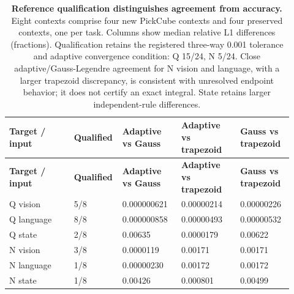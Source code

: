 \setlength{\tabcolsep}{2pt}
\begin{longtable}{p{0.220\linewidth} p{0.120\linewidth} p{0.200\linewidth} p{0.200\linewidth} p{0.180\linewidth}}
\caption{\textbf{Reference qualification distinguishes agreement from accuracy.} Eight contexts comprise four new PickCube contexts and four preserved contexts, one per task. Columns show median relative L1 differences (fractions). Qualification retains the registered three-way 0.001 tolerance and adaptive convergence condition: Q 15/24, N 5/24. Close adaptive/Gauss-Legendre agreement for N vision and language, with a larger trapezoid discrepancy, is consistent with unresolved endpoint behavior; it does not certify an exact integral. State retains larger independent-rule differences.}\label{tab:r1-diagnostics}\\
\toprule
\textbf{Target / input} & \textbf{Qualified} & \textbf{Adaptive vs Gauss} & \textbf{Adaptive vs trapezoid} & \textbf{Gauss vs trapezoid} \\
\midrule\endfirsthead
\toprule
\textbf{Target / input} & \textbf{Qualified} & \textbf{Adaptive vs Gauss} & \textbf{Adaptive vs trapezoid} & \textbf{Gauss vs trapezoid} \\
\midrule\endhead
\bottomrule\endfoot
Q vision & 5/8 & 0.000000621 & 0.00000214 & 0.00000226 \\
Q language & 8/8 & 0.000000858 & 0.00000493 & 0.00000532 \\
Q state & 2/8 & 0.00635 & 0.0000179 & 0.00622 \\
N vision & 3/8 & 0.0000119 & 0.00171 & 0.00171 \\
N language & 1/8 & 0.00000230 & 0.00172 & 0.00172 \\
N state & 1/8 & 0.00426 & 0.000801 & 0.00499 \\
\end{longtable}

